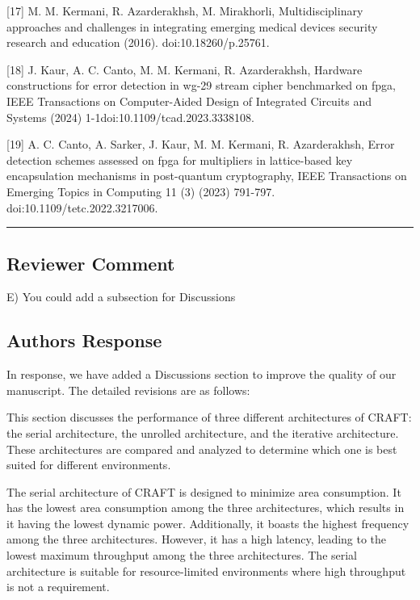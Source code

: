 [17] M. M. Kermani, R. Azarderakhsh, M. Mirakhorli, Multidisciplinary approaches and challenges in integrating emerging medical devices security research and education (2016). \linebreak doi:10.18260/p.25761.


[18] J. Kaur, A. C. Canto, M. M. Kermani, R. Azarderakhsh, Hardware constructions for error detection in wg-29 stream cipher benchmarked on fpga, IEEE Transactions on Computer-Aided Design of Integrated Circuits and Systems (2024) 1-1doi:10.1109/tcad.2023.3338108.

[19] A. C. Canto, A. Sarker, J. Kaur, M. M. Kermani, R. Azarderakhsh, Error detection schemes assessed on fpga for multipliers in lattice-based key encapsulation mechanisms in post-quantum cryptography, IEEE Transactions on Emerging Topics in Computing 11 (3) (2023) 791-797. doi:10.1109/tetc.2022.3217006.


\color{black}

\noindent\rule{\linewidth}{2.0pt}

\subsection{Reviewer Comment}
E) You could add a subsection for Discussions

\subsection{Authors Response}

In response, we have added a Discussions section to improve the quality of our manuscript. The detailed revisions are as follows:

\color{blue}

This section discusses the performance of three different architectures of CRAFT: the serial architecture, the unrolled architecture, and the iterative architecture. These architectures are compared and analyzed to determine which one is best suited for different environments.

The serial architecture of CRAFT is designed to minimize area consumption. It has the lowest area consumption among the three architectures, which results in it having the lowest dynamic power. Additionally, it boasts the highest frequency among the three architectures. However, it has a high latency, leading to the lowest maximum throughput among the three architectures. The serial architecture is suitable for resource-limited environments where high throughput is not a requirement.

